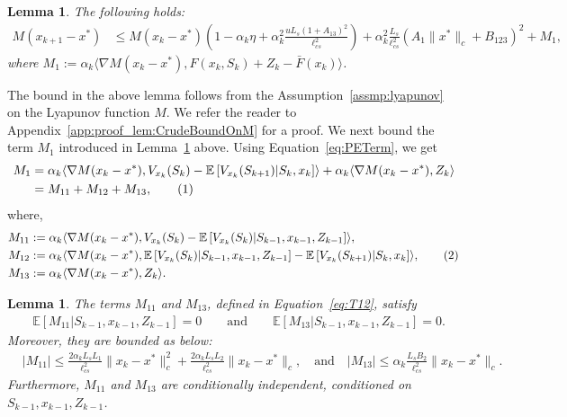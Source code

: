 \documentclass{article}
\newcommand{\numberthis}{\addtocounter{equation}{1}\tag{\theequation}}
\newcommand{\lrp}[1]{\left( #1 \right)}
\newcommand{\lrs}[1]{\left[ #1 \right]}
\newcommand{\E}[1]{\mathbb{E}\lrs{#1}}
\newcommand{\lcs}{\ell_{cs}}
\newcommand{\xk}{x_k}
\newtheorem{lemma}[theorem]{Lemma}
\begin{document}
\begin{lemma}\label{lem:CrudeBoundOnM}
The following holds:  
    \begin{align*}
        M(x_{k+1} - x^*) &\le M(\xk - x^*) \lrp{1-\alpha_k \eta + \alpha^2_k  \frac{uL_s (1+A_{13})^2}{\lcs^2} } + \alpha^2_k \frac{L_s }{\lcs^2} \lrp{A_{1}\|x^*\|_c + B_{123}}^2 + M_1 ,
    \end{align*}
    where $M_1 := \alpha_k \langle \nabla M(\xk - x^*), F(\xk, S_k) + Z_k - \bar{F}(x_k) \rangle$. 
\end{lemma}
The bound in the above lemma follows from the Assumption~\ref{assmp:lyapunov} on the Lyapunov function $M$. We refer the reader to Appendix~\ref{app:proof_lem:CrudeBoundOnM} for a proof.  We next bound the term $M_1$ introduced in Lemma~\ref{lem:CrudeBoundOnM} above. Using Equation~\eqref{eq:PETerm}, we get
\begin{align*}
    M_1 &= \alpha_k \langle \nabla M(\xk - x^*), V_{x_k}(S_k) - \E{V_{x_k}(S_{k+1}) | S_{k}, x_{k}} \rangle +  \alpha_k \langle \nabla M(\xk - x^*), Z_k \rangle\\
    &=  M_{11} + M_{12} + M_{13}, \numberthis\label{eq:T1intermediate1}
\end{align*} 
where, 
    \begin{align*}
        &M_{11} := \alpha_k \langle \nabla M(\xk - x^*), V_{x_k}(S_k) - \E{V_{x_k}(S_k) | S_{k-1}, x_{k-1}, Z_{k-1}} \rangle, \\
        & M_{12} := \alpha_k \langle \nabla M(\xk - x^*), \E{V_{x_k}(S_k) | S_{k-1}, x_{k-1}, Z_{k-1}} - \E{V_{x_k}(S_{k+1}) | S_{k}, x_{k}} \rangle, \numberthis \label{eq:T12}\\
        & M_{13} := \alpha_k \langle \nabla M(\xk - x^*), Z_k \rangle.
    \end{align*}
\begin{lemma}\label{lem:T11Properties}
    The terms $M_{11}$ and $M_{13}$, defined in Equation~\eqref{eq:T12}, satisfy 
    \begin{align*} 
    &\E{ M_{11} | S_{k-1}, x_{k-1}, Z_{k-1} }  = 0 \qquad \text{and} \qquad \E{M_{13} | S_{k-1}, x_{k-1}, Z_{k-1}} = 0.
    \end{align*}
    Moreover, they are bounded as below:
    \begin{align*} 
        &|M_{11}| \le \frac{2\alpha_k L_s L_1}{\lcs^2}\|\xk- x^*\|^2_c + \frac{2\alpha_k L_s L_2}{\lcs^2}\|\xk-x^*\|_c, \quad \text{and} \quad  |M_{13}| \le \alpha_k \frac{L_s B_2}{\lcs^2} \|x_k -x^*\|_c.
    \end{align*}
    Furthermore, $M_{11}$ and $M_{13}$ are conditionally independent, conditioned on $S_{k-1}, x_{k-1}, Z_{k-1}$. 
\end{lemma}
\end{document}
